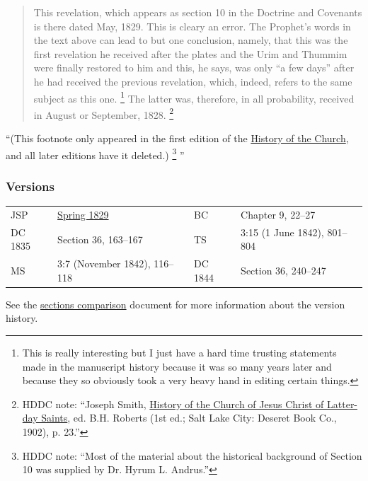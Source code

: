 				\begin{quote}
					This revelation, which appears as section 10 in the Doctrine and Covenants is there dated May, 1829. This is cleary an error. The Prophet's words in the text above can lead to but one conclusion, namely, that this was the first revelation he received after the plates and the Urim and Thummim were finally restored to him and this, he says, was only ``a few days'' after he had received the previous revelation, which, indeed, refers to the same subject as this one.%
						\footnote{%
							This is really interesting but I just have a hard time trusting statements made in the manuscript history because it was so many years later and because they so obviously took a very heavy hand in editing certain things.
							}
					The latter was, therefore, in all probability, received in August or September, 1828.%
						\footnote{%
							HDDC note: ``Joseph Smith, \uline{History of the Church of Jesus Christ of Latter-day Saints}, ed. B.H. Roberts (1st ed.; Salt Lake City: Deseret Book Co., 1902), p. 23.''
							}
				\end{quote}
				
			\noindent ``(This footnote only appeared in the first edition of the \uline{History of the Church}, and all later editions have it deleted.)%
				\footnote{%
					HDDC note: ``Most of the material about the historical background of Section 10 was supplied by Dr. Hyrum L. Andrus.''
					}%
			''
			
	\subsubsection{Versions}
		\label{DC10-V}
	
		\begin{tabular}{p{1in}p{2in}p{1in}p{2in}}
			JSP 	& \hyperref[EMS-1828-1829-JS-SPR-1829]{Spring 1829}		& BC & Chapter 9, 22--27 \\
			DC 1835	& Section 36, 163--167									& TS & 3:15 (1 June 1842), 801--804 \\
			MS		& 3:7 (November 1842), 116--118							& DC 1844 & Section 36, 240--247 \\
		\end{tabular}
		
		\medskip
		
		See the \href{https://drive.google.com/file/d/1goAvNz8jS4R8slYfMG_db55Ty2z_vmgK/view?usp=sharing}{sections comparison} document for more information about the version history.

